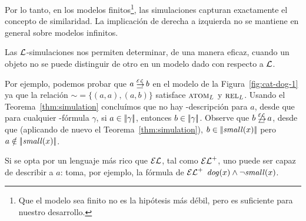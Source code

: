 Por lo tanto, en los modelos finitos\footnote{Que el modelo sea finito no es la hip\'otesis m\'as d\'ebil,
pero es suficiente para nuestro desarrollo.}, las simulaciones capturan exactamente el concepto de similaridad.
La implicaci\'on de derecha a izquierda no se mantiene en general sobre modelos infinitos.

Las $\mathcal{L}$-simulaciones nos permiten determinar, de una manera eficaz,
cuando un objeto no se puede distinguir de otro en un modelo dado con respecto a $\mathcal{L}$.

Por ejemplo, podemos probar que $a \simul{\EL} b$ en el modelo de la 
Figura~\ref{fig:cat-dog-1} ya que la relaci\'on ${\sim} = \{(a,a), (a, b) \}
$ satisface $\textsc{atom}_L$ y $\textsc{rel}_L$.
Usando el Teorema~\ref{thm:simulation} conclu\'imos que no hay
 \EL-descripci\'on para $a$, desde que para cualquier \EL-f\'ormula $\gamma$,
si $a\in|\!|\gamma|\!|$, entonces $b\in|\!|\gamma|\!|$.
Observe que $b \not\simul{\EL} a$, desde que
(aplicando de nuevo el Teorema~\ref{thm:simulation}), $b\in|\!|\mathit{small}(x)|\!|$ pero
$a\notin|\!|\mathit{small}(x)|\!|$.
%

Si se opta por un lenguaje m\'as rico que $\mathcal{EL}$, tal como ${\mathcal{EL}^+}$, uno puede ser
capaz de describir a $a$: toma, por ejemplo, la f\'ormula de ${\mathcal{EL}^+}$
$\mathit{dog}(x)\wedge\lnot\mathit{small}(x)$.



